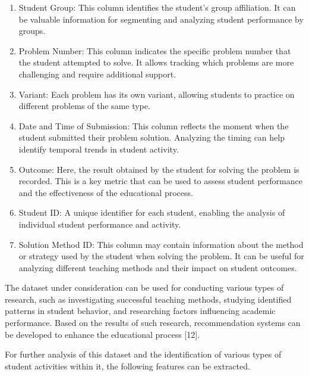 \documentclass[letterpaper]{article}
\begin{document}
\begin{multicols}{2}
\begin{justify}
      \begin{enumerate}
        \item Student Group: This column identifies the student's group affiliation. It can be valuable information for segmenting and analyzing student performance by groups.
        \item Problem Number: This column indicates the specific problem number that the student attempted to solve. It allows tracking which problems are more challenging and require additional support.
        \item Variant: Each problem has its own variant, allowing students to practice on different problems of the same type.
        \item	Date and Time of Submission: This column reflects the moment when the student submitted their problem solution. Analyzing the timing can help identify temporal trends in student activity.
        \item	Outcome: Here, the result obtained by the student for solving the problem is recorded. This is a key metric that can be used to assess student performance and the effectiveness of the educational process.
        \item	Student ID: A unique identifier for each student, enabling the analysis of individual student performance and activity.
        \item	Solution Method ID: This column may contain information about the method or strategy used by the student when solving the problem. It can be useful for analyzing different teaching methods and their impact on student outcomes.
      \end{enumerate}

      The dataset under consideration can be used for conducting various types of research, such as investigating successful teaching methods, studying identified patterns in student behavior, and researching factors influencing academic performance. Based on the results of such research, recommendation systems can be developed to enhance the educational process [12].

      For further analysis of this dataset and the identification of various types of student activities within it, the following features can be extracted.


\end{justify}
\end{multicols}
\end{document}
